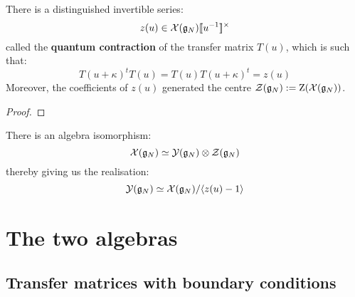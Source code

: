             \begin{lemma} \label{lemma: quantum_contractions}
                There is a distinguished invertible series:
                    $$z(u) \in \calX(\g_N)[\![u^{-1}]\!]^{\x}$$
                called the \textbf{quantum contraction} of the transfer matrix $T(u)$, which is such that:
                    \begin{equation} \label{equation: quantum_contraction}
                        T(u + \kappa)^t T(u) = T(u) T(u + \kappa)^t = z(u)
                    \end{equation}
                Moreover, the coefficients of $z(u)$ generated the centre $\mathcal{Z}(\mathfrak{g}_N) := \mathrm{Z}( \mathcal{X}(\mathfrak{g}_N) )$.
            \end{lemma}
                \begin{proof}
                    
                \end{proof}
            \begin{corollary}
                There is an algebra isomorphism:
                    $$\calX(\g_N) \cong \calY(\g_N) \tensor \calZ(\g_N)$$
                thereby giving us the realisation:
                    $$\mathcal{Y}(\mathfrak{g}_N) \simeq \mathcal{X}(\mathfrak{g}_N)/\langle z(u) - 1\rangle$$
            \end{corollary}

    \section{The two algebras}
        \subsection{Transfer matrices with boundary conditions}
            \begin{definition} \label{def: boundary_transfer_matrices}
                
            \end{definition}
        

